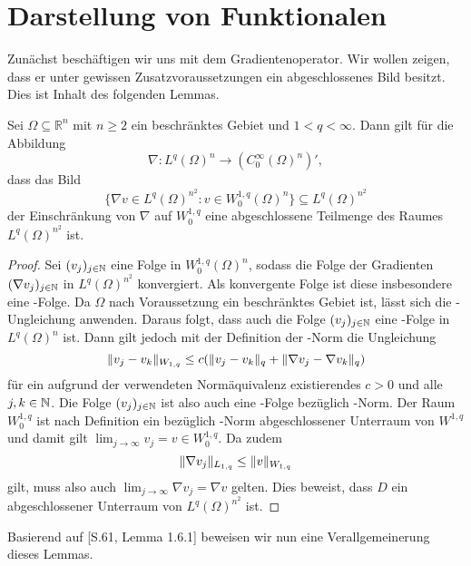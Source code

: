\section{Darstellung von Funktionalen}

Zunächst beschäftigen wir uns mit dem Gradientenoperator.
Wir wollen zeigen, dass er unter gewissen Zusatzvoraussetzungen ein abgeschlossenes Bild besitzt.
Dies ist Inhalt des folgenden Lemmas.

\begin{lem}
  \label{lem:closedImageGradient}
  Sei $\Omega \subseteq \mathbb{R}^n$ mit $n \geq 2$ ein beschränktes Gebiet und $1 < q < \infty$.
  Dann gilt für die Abbildung
  $$
  \nabla \colon L^{q}(\Omega)^{n} \to (C_0^\infty(\Omega)^n)',
  $$
  dass das Bild
  $$
  \{\nabla v \in L^{q}(\Omega)^{n^2} \colon v \in W_0^{1,q}(\Omega)^n\} \subseteq L^{q}(\Omega)^{n^2}
  $$
  der Einschränkung von $\nabla$ auf $W_0^{1,q}$ eine abgeschlossene Teilmenge des Raumes $L^q(\Omega)^{n^2}$ ist.
\end{lem}

\begin{proof}
  Sei $(v_j)_{j \in \mathbb{N}}$ eine Folge in $W_0^{1,q}(\Omega)^n$, sodass die Folge der Gradienten $(\nabla v_j)_{j \in \mathbb{N}}$ in $L^q(\Omega)^{n^2}$ konvergiert.
  Als konvergente Folge ist diese insbesondere eine \cauchy\hyp{}Folge.
  Da $\Omega$ nach Voraussetzung ein beschränktes Gebiet ist, lässt sich die \poincare\hyp{}Ungleichung anwenden.
  Daraus folgt, dass auch die Folge $(v_j)_{j \in \mathbb{N}}$ eine \cauchy\hyp{}Folge in $L^q(\Omega)^n$ ist.
  Dann gilt jedoch mit der Definition der \sobolev\hyp{}Norm die Ungleichung
  $$
  \lVert v_j - v_k \rVert_{W_{1,q}} \leq c (\lVert v_j - v_k \rVert_q + \lVert \nabla v_j - \nabla v_k \rVert_q)
  $$
  für ein aufgrund der verwendeten Normäquivalenz existierendes $c > 0$ und alle $j,k \in \mathbb{N}$.
  Die Folge $(v_j)_{j \in \mathbb{N}}$ ist also auch eine \cauchy\hyp{}Folge bezüglich \sobolev\hyp{}Norm.
  Der Raum $W_0^{1,q}$ ist nach Definition ein bezüglich \sobolev\hyp{}Norm abgeschlossener Unterraum von $W^{1,q}$ und damit gilt $\lim_{j \to \infty} v_j = v \in W_0^{1,q}$.
  Da zudem
  $$
  \lVert \nabla v_j \rVert_{L_{1,q}} \leq \lVert v \rVert_{W_{1,q}}  
  $$
  gilt, muss also auch $\lim_{j \to \infty} \nabla v_j = \nabla v$ gelten.
  Dies beweist, dass $D$ ein abgeschlossener Unterraum von $L^q(\Omega)^{n^2}$ ist.
\end{proof}

Basierend auf \cite{sohr2001navier}[S.61, Lemma 1.6.1] beweisen wir nun eine Verallgemeinerung dieses Lemmas. 

